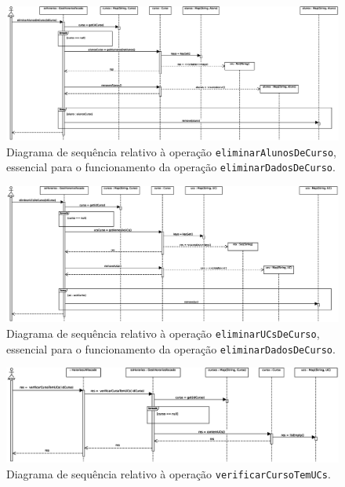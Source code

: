 \documentclass[12pt, a4paper]{article}
\begin{document}
\begin{landscape}
        \begin{figure}[H]
            \centering
            \includegraphics[scale=0.70]{Imagens/Modelos/eliminarAlunosDeCurso.svg.eps}
            \caption{
                Diagrama de sequência relativo à operação \texttt{eliminarAlunosDeCurso}, essencial
                para o funcionamento da operação \texttt{eliminarDadosDeCurso}.
            }
        \end{figure}

        \vspace*{\fill}
        \pagebreak
        \vspace*{\fill}

        \begin{figure}[H]
            \centering
            \includegraphics[scale=0.70]{Imagens/Modelos/eliminarUCsDeCurso.svg.eps}
            \caption{
                Diagrama de sequência relativo à operação \texttt{eliminarUCsDeCurso}, essencial
                para o funcionamento da operação \texttt{eliminarDadosDeCurso}.
            }
        \end{figure}

        \vspace*{\fill}
        \pagebreak
        \vspace*{\fill}

        \begin{figure}[H]
            \centering
            \includegraphics[scale=0.75]{Imagens/Modelos/verificarCursoTemUCs.svg.eps}
            \caption{
                Diagrama de sequência relativo à operação \texttt{verificarCursoTemUCs}.
            }
        \end{figure}


\end{landscape}
\end{document}
